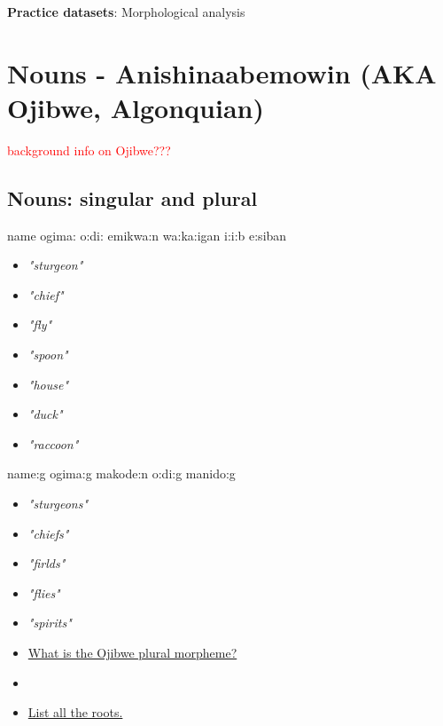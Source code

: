 \documentclass[a4paper,11pt]{article}
\begin{document}
\begin{center}
\Large{\textbf{Practice datasets}: Morphological analysis}
\end{center}


\section{Nouns - Anishinaabemowin (AKA Ojibwe, Algonquian)}

\textcolor{red}{background info on Ojibwe???}




\subsection{Nouns: singular and plural}


\begin{multicols}{4}
\begin{exe}
\ex name 
\ex ogima: 
\ex o:d{\textyogh}i: 
\ex emikwa:n
\ex wa:ka:{\textglotstop}igan 
\ex {\textyogh}i:i:b
\ex e:siban 
\end{exe}
\columnbreak
\begin{itemize}
\item[] \textit{"sturgeon"}
\item[] \textit{"chief"}
\item[] \textit{"fly"}
\item[] \textit{"spoon"}
\item[] \textit{"house"}
\item[] \textit{"duck"}
\item[] \textit{"raccoon"}
\end{itemize}
\columnbreak
\begin{exe}
\ex name:g
\ex ogima:g 
\ex makode:n 
\ex o:d{\textyogh}i:g 
\ex manido:g 
\end{exe}
\columnbreak
\begin{itemize}
\item[] \textit{"sturgeons"}
\item[] \textit{"chiefs"}
\item[] \textit{"firlds"}
\item[] \textit{"flies"}
\item[] \textit{"spirits"}
\end{itemize}
\end{multicols}

\vspace{1cm}

\begin{itemize}
\item \underline{What is the Ojibwe plural morpheme?}
\item[] 
\item \underline{List all the roots.}
\end{itemize}
\end{document}
